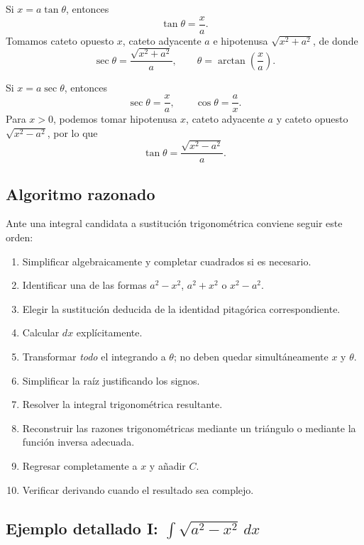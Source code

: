 \documentclass[12pt]{article}
\theoremstyle{definition}
\theoremstyle{remark}
\begin{document}
Si $x=a\tan\theta$, entonces
\[
\tan\theta=\frac{x}{a}.
\]
Tomamos cateto opuesto $x$, cateto adyacente $a$ e hipotenusa $\sqrt{x^2+a^2}$, de donde
\[
\sec\theta=\frac{\sqrt{x^2+a^2}}{a},
\qquad
\theta=\arctan\left(\frac{x}{a}\right).
\]

Si $x=a\sec\theta$, entonces
\[
\sec\theta=\frac{x}{a},
\qquad
\cos\theta=\frac{a}{x}.
\]
Para $x>0$, podemos tomar hipotenusa $x$, cateto adyacente $a$ y cateto opuesto $\sqrt{x^2-a^2}$, por lo que
\[
\tan\theta=\frac{\sqrt{x^2-a^2}}{a}.
\]

\subsection*{Algoritmo razonado}

Ante una integral candidata a sustitución trigonométrica conviene seguir este orden:
\begin{enumerate}
\item Simplificar algebraicamente y completar cuadrados si es necesario.
\item Identificar una de las formas $a^2-x^2$, $a^2+x^2$ o $x^2-a^2$.
\item Elegir la sustitución deducida de la identidad pitagórica correspondiente.
\item Calcular $dx$ explícitamente.
\item Transformar \emph{todo} el integrando a $\theta$; no deben quedar simultáneamente $x$ y $\theta$.
\item Simplificar la raíz justificando los signos.
\item Resolver la integral trigonométrica resultante.
\item Reconstruir las razones trigonométricas mediante un triángulo o mediante la función inversa adecuada.
\item Regresar completamente a $x$ y añadir $C$.
\item Verificar derivando cuando el resultado sea complejo.
\end{enumerate}

\subsection*{Ejemplo detallado I: \texorpdfstring{$\int\sqrt{a^2-x^2}\,dx$}{integral sqrt(a2-x2)}}
\end{document}
